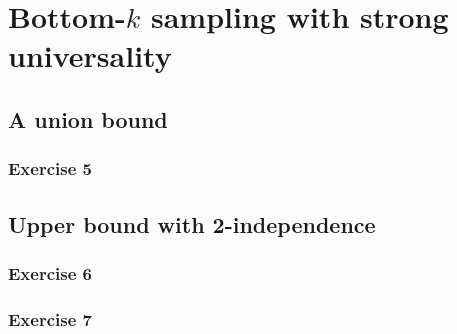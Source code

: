\section{Bottom-\(k\) sampling with strong universality}
\subsection{A union bound}
\subsubsection{Exercise 5}
\subsection{Upper bound with 2-independence}
\subsubsection{Exercise 6}
\subsubsection{Exercise 7}

